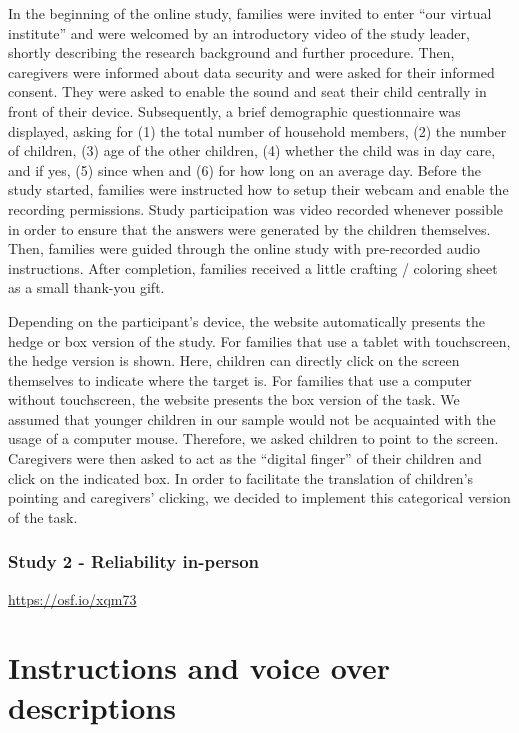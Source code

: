 \documentclass[
  man,floatsintext]{apa6}
\begin{document}
In the beginning of the online study, families were invited to enter ``our virtual institute'' and were welcomed by an introductory video of the study leader, shortly describing the research background and further procedure. Then, caregivers were informed about data security and were asked for their informed consent. They were asked to enable the sound and seat their child centrally in front of their device. Subsequently, a brief demographic questionnaire was displayed, asking for (1) the total number of household members, (2) the number of children, (3) age of the other children, (4) whether the child was in day care, and if yes, (5) since when and (6) for how long on an average day. Before the study started, families were instructed how to setup their webcam and enable the recording permissions. Study participation was video recorded whenever possible in order to ensure that the answers were generated by the children themselves.
Then, families were guided through the online study with pre-recorded audio instructions. After completion, families received a little crafting / coloring sheet as a small thank-you gift.

Depending on the participant's device, the website automatically presents the hedge or box version of the study. For families that use a tablet with touchscreen, the hedge version is shown. Here, children can directly click on the screen themselves to indicate where the target is. For families that use a computer without touchscreen, the website presents the box version of the task. We assumed that younger children in our sample would not be acquainted with the usage of a computer mouse. Therefore, we asked children to point to the screen. Caregivers were then asked to act as the ``digital finger'' of their children and click on the indicated box. In order to facilitate the translation of children's pointing and caregivers' clicking, we decided to implement this categorical version of the task.

\hypertarget{study-2---reliability-in-person}{%
\subsubsection{Study 2 - Reliability in-person}\label{study-2---reliability-in-person}}

\url{https://osf.io/xqm73}

\hypertarget{instructions-and-voice-over-descriptions}{%
\section{Instructions and voice over descriptions}\label{instructions-and-voice-over-descriptions}}
\end{document}
